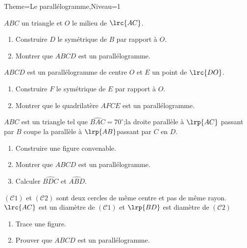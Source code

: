 \documentclass[a4paper,12pt]{article}
\begin{document}
\begin{Maquette}[Fiche]{Theme=Le parallélogramme,Niveau=1}

\begin{exercice}
$ABC$ un triangle et $O$ le milieu de $\lrc{AC}$.
\begin{enumerate}
\item Construire $D$ le symétrique de $B$ par rapport à $O$.
\item Montrer que $ABCD$ est un parallélogramme.
\end{enumerate}
\end{exercice}

\begin{exercice}
$ABCD$ est un parallélogramme de centre $O$ et $E$ un point de $\lrc{DO}$.
\begin{enumerate}
\item Construire $F$ le symétrique de $E$ par rapport à $O$.
\item Montrer que le quadrilatère $AFCE$ est un parallélogramme.
\end{enumerate}
\end{exercice}

\begin{exercice}
$ABC$ est un triangle tel que $\widehat{BAC}=70^{\circ}$;la droite parallèle à $\lrp{AC}$ passant par $B$ coupe la parallèle à $\lrp{AB}$passant par $C$ en $D$.
\begin{enumerate}
\item Construire une figure convenable.
\item Montrer que $ABCD$ est un parallélogramme.
\item Calculer $\widehat{BDC}$ et $\widehat{ABD}$.
\end{enumerate}
\end{exercice}

\begin{exercice}
$(\mathcal{C}1)$ et $(\mathcal{C}2)$ sont deux cercles de même centre et pas de même rayon.$\lrc{AC}$ est un diamètre de $(\mathcal{C}1)$ et $\lrp{BD}$ est diamètre de $(\mathcal{C}2)$
\begin{enumerate}
\item Trace une figure.
\item Prouver que $ABCD$ est un parallélogramme.
\end{enumerate}
\end{exercice}


\end{Maquette}
\end{document}
